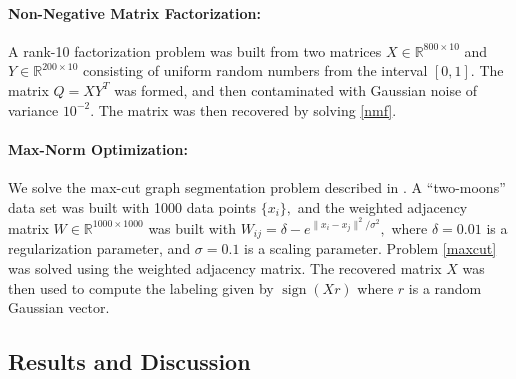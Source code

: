 \documentclass{amsart}
\newcommand{\reals}{\mathbb{R}}
\DeclareMathOperator*{\sign}{sign}
\theoremstyle{definition}
\begin{document}
\paragraph{\textbf{Non-Negative Matrix Factorization:}}
 A rank-10 factorization problem was built from two matrices $X\in \reals^{800\times 10}$ and $Y\in \reals^{200\times 10}$ consisting of uniform random numbers from the interval $[0,1].$  The matrix $Q = XY^T$ was formed, and then contaminated with Gaussian noise of variance $10^{-2}.$  The matrix was then recovered by solving \eqref{nmf}.
 
 \paragraph{\textbf{Max-Norm Optimization:}}
 We solve the max-cut graph segmentation problem described in \cite{LRSST10}.  A ``two-moons'' data set was built with 1000 data points $\{x_i\},$ and the weighted adjacency matrix $W\in \reals^{1000\times 1000}$ was built with $W_{ij} =\delta-e^{\|x_i-x_j\|^2/\sigma^2},$ where $\delta = 0.01$ is a regularization parameter, and $\sigma=0.1$ is a scaling parameter.  Problem \eqref{maxcut} was solved using the weighted adjacency matrix.  The recovered matrix $X$ was then used to compute the labeling given by $\sign(Xr)$ where $r$ is a random Gaussian vector.    

\subsection{Results and Discussion}
\end{document}
